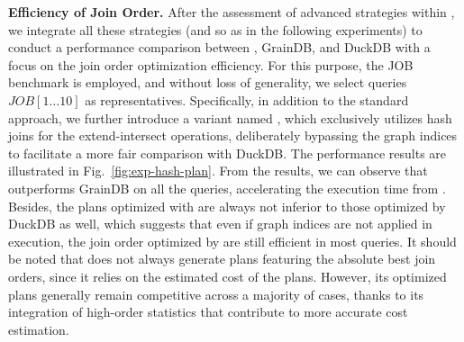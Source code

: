 \noindent\textbf{Efficiency of Join Order.}
After the assessment of advanced strategies within \name, we integrate all these strategies (and so as in the following experiments) to conduct a performance comparison between \name, GrainDB, and DuckDB with a focus on the join order optimization efficiency.
For this purpose, the JOB benchmark is employed, and without loss of generality, we select queries $JOB[1\ldots 10]$ as representatives.
Specifically, in addition to the standard \name approach, we further introduce a variant named \relgohash, which exclusively utilizes hash joins for the extend-intersect operations, deliberately bypassing the graph indices to facilitate a more fair comparison with DuckDB.
The performance results are illustrated in Fig.~\ref{fig:exp-hash-plan}.
From the results, we can observe that \name outperforms GrainDB on all the queries, accelerating the execution time from .
Besides, the plans optimized with \relgohash are always not inferior to those optimized by DuckDB as well, which suggests that even if graph indices are not applied in execution, the join order optimized by \name are still efficient in most queries.
It should be noted that \name does not always generate plans featuring the absolute best join orders, since it relies on the estimated cost of the plans.
However, its optimized plans generally remain competitive across a majority of cases, thanks to its integration of high-order statistics that contribute to more accurate cost estimation.




